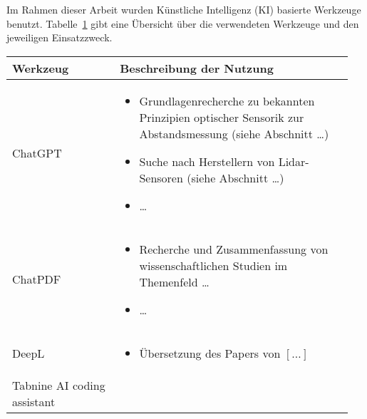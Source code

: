 \setcounter{chapter}{1}

Im Rahmen dieser Arbeit wurden Künstliche Intelligenz (KI) basierte Werkzeuge benutzt. Tabelle~\ref{tab:anhang_uebersicht_KI_werkzeuge} gibt eine Übersicht über die verwendeten Werkzeuge und den jeweiligen Einsatzzweck.

\begin{table}[hbt]	
	\centering
	\renewcommand{\arraystretch}{1.5}	%
	\label{tab:anhang_uebersicht_KI_werkzeuge}
	\begin{tabular}{>{\raggedright\arraybackslash}p{0.3\linewidth} >{\raggedright\arraybackslash}p{0.65\linewidth}}
		\textbf{Werkzeug} & \textbf{Beschreibung der Nutzung}\\
		\hline 
		\hline
		ChatGPT & 	\vspace{-\topsep}
					\begin{itemize}[noitemsep,topsep=0pt,partopsep=0pt,parsep=0pt] 
						\item Grundlagenrecherche zu bekannten Prinzipien optischer Sensorik zur Abstandsmessung (siehe Abschnitt \ldots)
						\item Suche nach Herstellern von Lidar-Sensoren (siehe Abschnitt \ldots)
						\item \ldots
				   	\end{itemize} \\
		ChatPDF &	\vspace{-\topsep}
					\begin{itemize}[noitemsep,topsep=0pt,partopsep=0pt,parsep=0pt] 
					\item Recherche und Zusammenfassung von wissenschaftlichen Studien im Themenfeld \ldots
					\item \ldots
					\end{itemize} \\ 
		DeepL	&	\vspace{-\topsep}
					\begin{itemize}[noitemsep,topsep=0pt,partopsep=0pt,parsep=0pt] 
					\item Übersetzung des Papers von $[\ldots]$
					\end{itemize} \\ 
		Tabnine AI coding assistant &	\vspace{-\topsep}
							\begin{itemize}[noitemsep,topsep=0pt,partopsep=0pt,parsep=0pt] 

\end{itemize}
\end{tabular}
\end{table}
